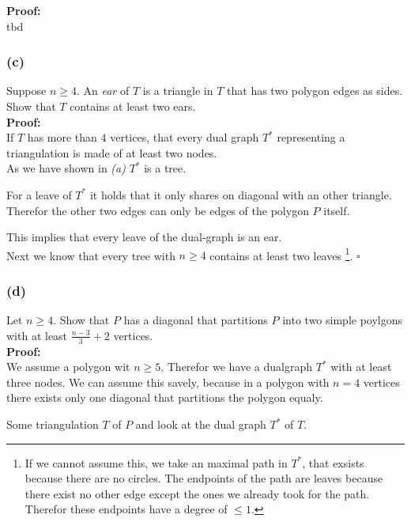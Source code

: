 \documentclass[11pt,a4paper,ngerman]{article}
\begin{document}
\textbf{Proof:}\\

tbd

\subsubsection*{(c)}

Suppose $n \geq 4$. An \emph{ear} of $T$ is a triangle in $T$ that has two polygon edges
as sides. Show that $T$ contains at least two ears.\\

\textbf{Proof:}\\

If $T$ has more than $4$ vertices, that every dual graph $T^*$ representing 
a triangulation is made of at least two nodes.\\
As we have shown in \emph{(a)} $T^*$ is a tree.

For a leave of $T^*$ it holds that it only shares on diagonal with an other triangle.
Therefor the other two edges can only be edges of the polygon $P$ itself.

This implies that every leave of the dual-graph is an ear.\\

Next we know that every tree with $n\geq 4$ contains at least two leaves
\footnote{If we cannot assume this, we take an maximal path in $T^*$, that exsists because there are no circles.
The endpoints of the path are leaves because there exist no other edge except the ones we already took for the path.
Therefor these endpoints have a degree of $\leq 1$.}.
\mbox{} \hfill $\square$

\subsubsection*{(d)}

Let $n \geq 4$. Show that $P$ has a diagonal that partitions $P$ into two
simple poylgons with at least $\frac{n-3}{3} + 2$ vertices.\\

\textbf{Proof:}\\

We assume a polygon wit $n\geq 5$. Therefor we have a dualgraph $T^*$ with at least
three nodes. We can assume this savely, because in a polygon with $n = 4$ vertices
there exists only one diagonal that partitions the polygon equaly.

Some triangulation $T$ of $P$ and look at the dual graph $T^*$ of $T$.
\end{document}
